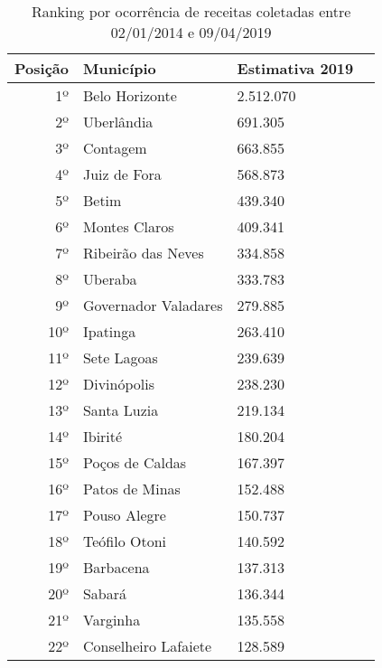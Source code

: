\begin{table}[H]
	\centering
	\caption{Ranking por ocorrência de receitas coletadas entre 02/01/2014 e 09/04/2019}
	\vspace{0.5cm}
	\begin{tabular}{r|l|l|l}
		    
		Posição & Município           & Estimativa 2019 \\ %
		\hline                               %
		1º       & Belo Horizonte       & 2.512.070       \\
		2º       & Uberlândia           & 691.305         \\
		3º       & Contagem             & 663.855         \\
		4º       & Juiz de Fora         & 568.873         \\
		5º       & Betim                & 439.340         \\
		6º       & Montes Claros        & 409.341         \\
		7º       & Ribeirão das Neves   & 334.858         \\
		8º       & Uberaba              & 333.783         \\
		9º       & Governador Valadares & 279.885         \\
		10º      & Ipatinga             & 263.410         \\
		11º      & Sete Lagoas          & 239.639         \\
		12º      & Divinópolis          & 238.230         \\
		13º      & Santa Luzia          & 219.134         \\
		14º      & Ibirité              & 180.204         \\
		15º      & Poços de Caldas      & 167.397         \\
		16º      & Patos de Minas       & 152.488         \\
		17º      & Pouso Alegre         & 150.737         \\
		18º      & Teófilo Otoni        & 140.592         \\
		19º      & Barbacena            & 137.313         \\
		20º      & Sabará               & 136.344         \\
		21º      & Varginha             & 135.558         \\
		22º      & Conselheiro Lafaiete & 128.589         \\

\end{tabular}
\end{table}
